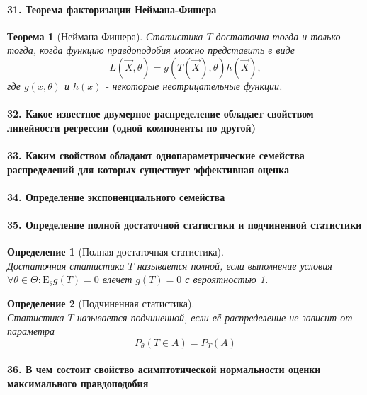 \documentclass[titlepage]{article}
\newcommand{\sE}{\mathrm{E}}
\newtheorem{theorem}{Теорема}
\newtheorem{definition}{Определение}
\begin{document}
\paragraph{31. Теорема факторизации Неймана-Фишера}
\begin{theorem}[Неймана-Фишера]
	Статистика $T$ достаточна тогда и только тогда, когда функцию правдоподобия можно представить в виде
	\[L(\vec X, \theta) = g(T(\vec X),\theta)h(\vec X),\]
	где $g(x,\theta)$ и $h(x)$ - некоторые неотрицательные функции.
\end{theorem}

\paragraph{32. Какое известное двумерное распределение обладает свойством линейности регрессии (одной компоненты по другой)}

\paragraph{33. Каким свойством обладают однопараметрические семейства распределений для которых существует эффективная оценка}

\paragraph{34. Определение экспоненциального семейства}

\paragraph{35. Определение полной достаточной статистики и подчиненной статистики}
\begin{definition}[Полная достаточная статистика] ~\\
	Достаточная статистика $T$ называется полной, если выполнение условия $\forall \theta \in \Theta: \sE_\theta g(T) = 0$ влечет $g(T) = 0$  с вероятностью 1.
\end{definition}
\begin{definition}[Подчиненная статистика] ~\\
	Статистика $T$ называется подчиненной, если её распределение не зависит от параметра
	$$P_\theta (T\in A) = P_T(A)$$
\end{definition}

\paragraph{36. В чем состоит свойство асимптотической нормальности оценки максимального правдоподобия}
\end{document}
